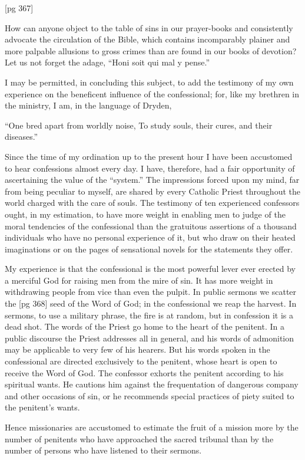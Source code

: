 [pg 367]

How can anyone object to the table of sins in
our prayer-books and consistently advocate the
circulation of the Bible, which contains incomparably
plainer and more palpable allusions to
gross crimes than are found in our books of devotion?
Let us not forget the adage, “Honi soit
qui mal y pense.”

I may be permitted, in concluding this subject,
to add the testimony of my own experience on the
beneficent influence of the confessional; for, like
my brethren in the ministry, I am, in the language
of Dryden,

“One bred apart from worldly noise,
To study souls, their cures, and their diseases.”

Since the time of my ordination up to the present
hour I have been accustomed to hear confessions
almost every day. I have, therefore, had a
fair opportunity of ascertaining the value of the
“system.” The impressions forced upon my
mind, far from being peculiar to myself, are shared
by every Catholic Priest throughout the world
charged with the care of souls. The testimony of
ten experienced confessors ought, in my estimation,
to have more weight in enabling men to
judge of the moral tendencies of the confessional
than the gratuitous assertions of a thousand individuals
who have no personal experience of it,
but who draw on their heated imaginations or on
the pages of sensational novels for the statements
they offer.

My experience is that the confessional is the
most powerful lever ever erected by a merciful
God for raising men from the mire of sin. It has
more weight in withdrawing people from vice than
even the pulpit. In public sermons we scatter the
[pg 368]
seed of the Word of God; in the confessional we
reap the harvest. In sermons, to use a military
phrase, the fire is at random, but in confession it
is a dead shot. The words of the Priest go home
to the heart of the penitent. In a public discourse
the Priest addresses all in general, and his words
of admonition may be applicable to very few of
his hearers. But his words spoken in the confessional
are directed exclusively to the penitent,
whose heart is open to receive the Word of God.
The confessor exhorts the penitent according to his
spiritual wants. He cautions him against the frequentation
of dangerous company and other occasions
of sin, or he recommends special practices of
piety suited to the penitent's wants.

Hence missionaries are accustomed to estimate
the fruit of a mission more by the number of penitents
who have approached the sacred tribunal
than by the number of persons who have listened
to their sermons.

